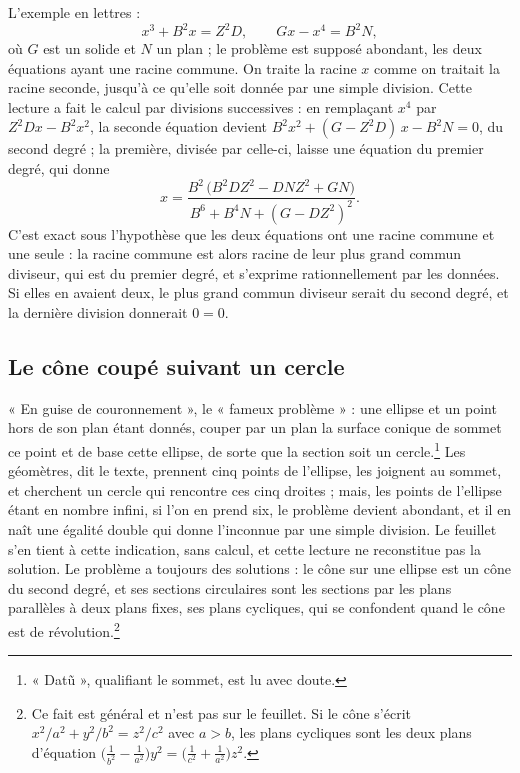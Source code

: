 \documentclass[11pt,a4paper]{article}
\begin{document}
L'exemple en lettres :
\[ x^3 + B^2x = Z^2D, \qquad Gx - x^4 = B^2N , \]
où $G$ est un solide et $N$ un plan ; le problème est supposé abondant, les
deux équations ayant une racine commune. On traite la racine $x$ comme on
traitait la racine seconde, jusqu'à ce qu'elle soit donnée par une simple
division. Cette lecture a fait le calcul par divisions successives : en
remplaçant $x^4$ par $Z^2Dx - B^2x^2$, la seconde équation devient
$B^2x^2 + (G - Z^2D)\,x - B^2N = 0$, du second degré ; la première, divisée par
celle-ci, laisse une équation du premier degré, qui donne
\[ x = \frac{B^2\,\bigl(B^2DZ^2 - DNZ^2 + GN\bigr)}
            {B^6 + B^4N + (G - DZ^2)^2} . \]
C'est exact sous l'hypothèse que les deux équations ont une racine commune et
une seule : la racine commune est alors racine de leur plus grand commun
diviseur, qui est du premier degré, et s'exprime rationnellement par les
données. Si elles en avaient deux, le plus grand commun diviseur serait du
second degré, et la dernière division donnerait $0 = 0$.

\subsection*{Le cône coupé suivant un cercle}

« En guise de couronnement », le « fameux problème » : une ellipse et un point
hors de son plan étant donnés, couper par un plan la surface conique de sommet
ce point et de base cette ellipse, de sorte que la section soit un
cercle.\footnote{« Datũ », qualifiant le sommet, est lu avec doute.} Les
géomètres, dit le texte, prennent cinq points de l'ellipse, les joignent au
sommet, et cherchent un cercle qui rencontre ces cinq droites ; mais, les
points de l'ellipse étant en nombre infini, si l'on en prend six, le problème
devient abondant, et il en naît une égalité double qui donne l'inconnue par une
simple division. Le feuillet s'en tient à cette indication, sans calcul, et
cette lecture ne reconstitue pas la solution. Le problème a toujours des
solutions : le cône sur une ellipse est un cône du second degré, et ses
sections circulaires sont les sections par les plans parallèles à deux plans
fixes, ses plans cycliques, qui se confondent quand le cône est de
révolution.\footnote{Ce fait est général et n'est pas sur le feuillet. Si le
cône s'écrit $x^2/a^2 + y^2/b^2 = z^2/c^2$ avec $a > b$, les plans cycliques
sont les deux plans d'équation
$\bigl(\tfrac1{b^2} - \tfrac1{a^2}\bigr)y^2 = \bigl(\tfrac1{c^2} + \tfrac1{a^2}\bigr)z^2$.}
\end{document}
